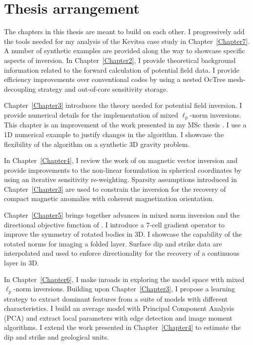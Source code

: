 \section{Thesis arrangement}
The chapters in this thesis are meant to build on each other. I progressively add the tools needed for my analysis of the Kevitsa case study in Chapter~\ref{Chapter7}. A number of synthetic examples are provided along the way to showcase specific aspects of inversion.
In Chapter~\ref{Chapter2}, I provide theoretical background information related to the forward calculation of potential field data. I provide efficiency improvements over conventional codes by using a nested OcTree mesh-decoupling strategy and out-of-core sensitivity storage.

Chapter~\ref{Chapter3} introduces the theory needed for potential field inversion. I provide numerical details for the implementation of mixed $\ell_p$-norm inversions. This chapter is an improvement of the work presented in my MSc thesis \cite[]{FournierDavis2016a}. I use a 1D numerical example to justify changes in the algorithm. I showcase the flexibility of the algorithm on a synthetic 3D gravity problem.

In Chapter~\ref{Chapter4}, I review the work of \cite{Lelievre2009} on magnetic vector inversion and provide improvements to the non-linear formulation in spherical coordinates by using an iterative sensitivity re-weighting. Sparsity assumptions introduced in Chapter~\ref{Chapter3} are used to constrain the inversion for the recovery of compact magnetic anomalies with coherent magnetization orientation.

Chapter~\ref{Chapter5} brings together advances in mixed norm inversion and the directional objective function of \cite{LiDWO2000}. I introduce a 7-cell gradient operator to improve the symmetry of rotated bodies in 3D. I showcase the capability of the rotated norms for imaging a folded layer. Surface dip and strike data are interpolated and used to enforce directionality for the recovery of a continuous layer in 3D.

In Chapter~\ref{Chapter6}, I make inroads in exploring the model space with mixed $\ell_p$-norm inversions. Building upon Chapter~\ref{Chapter3}, I propose a learning strategy to extract dominant features from a suite of models with different characteristics. I build an average model with Principal Component Analysis (PCA) and extract local parameters with edge detection and image moment algorithms. I extend the work presented in Chapter~\ref{Chapter4} to estimate the dip and strike and geological units.

